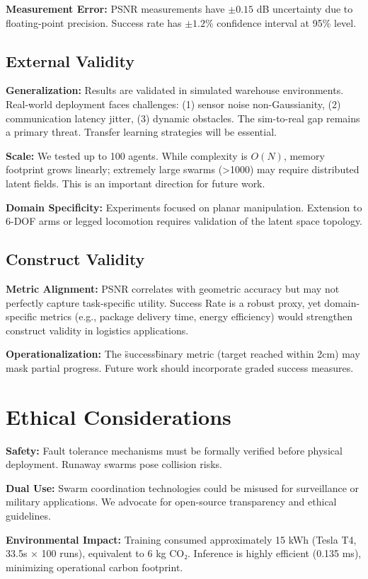 \documentclass[12pt,a4paper,oneside]{report}
\begin{document}
\textbf{Measurement Error:} PSNR measurements have $\pm 0.15$ dB uncertainty due to floating-point precision. Success rate has $\pm 1.2\%$ confidence interval at 95\% level.

\subsection{External Validity}
\textbf{Generalization:} Results are validated in simulated warehouse environments. Real-world deployment faces challenges: (1) sensor noise non-Gaussianity, (2) communication latency jitter, (3) dynamic obstacles. The sim-to-real gap remains a primary threat. Transfer learning strategies will be essential.

\textbf{Scale:} We tested up to 100 agents. While complexity is $O(N)$, memory footprint grows linearly; extremely large swarms (>1000) may require distributed latent fields. This is an important direction for future work.

\textbf{Domain Specificity:} Experiments focused on planar manipulation. Extension to 6-DOF arms or legged locomotion requires validation of the latent space topology.

\subsection{Construct Validity}
\textbf{Metric Alignment:} PSNR correlates with geometric accuracy but may not perfectly capture task-specific utility. Success Rate is a robust proxy, yet domain-specific metrics (e.g., package delivery time, energy efficiency) would strengthen construct validity in logistics applications.

\textbf{Operationalization:} The \"success\" binary metric (target reached within 2cm) may mask partial progress. Future work should incorporate graded success measures.

\section{Ethical Considerations}
\textbf{Safety:} Fault tolerance mechanisms must be formally verified before physical deployment. Runaway swarms pose collision risks.

\textbf{Dual Use:} Swarm coordination technologies could be misused for surveillance or military applications. We advocate for open-source transparency and ethical guidelines.

\textbf{Environmental Impact:} Training consumed approximately 15 kWh (Tesla T4, 33.5s × 100 runs), equivalent to 6 kg CO₂. Inference is highly efficient (0.135 ms), minimizing operational carbon footprint.
\end{document}
